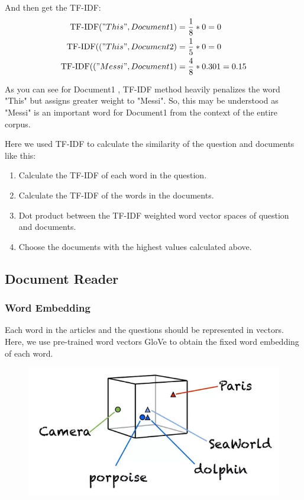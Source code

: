 \documentclass[12pt]{article}
\numberwithin{equation}{section}
\begin{document}
	And then get the TF-IDF:
	\begin{align*}
		\text{TF-IDF}("This",Document1) &= \frac{1}{8} * 0 = 0\\
		\text{TF-IDF}(("This",Document2) &= \frac{1}{5} *0 = 0\\
		\text{TF-IDF}(("Messi",Document1) &= \frac{4}{8} * 0.301 = 0.15
	\end{align*} \par	
	As you can see for Document1 , TF-IDF method heavily penalizes the word "This" but assigns greater weight to "Messi". So, this may be understood as "Messi" is an important word for Document1 from the context of the entire corpus. \par
	Here we used TF-IDF to calculate the similarity of the question and documents like this:
	\begin{enumerate}
	\item Calculate the TF-IDF of each word in the question.
	\item Calculate the TF-IDF of the words in the documents.
	\item Dot product between the TF-IDF weighted word vector spaces of question and documents.
	\item Choose the documents with the highest values calculated above.
	\end{enumerate}
\subsection{Document Reader}
\subsubsection{Word Embedding}
	Each word in the articles and the questions should be represented in vectors. Here, we use pre-trained word vectors GloVe\citep{pennington2014glove} to obtain the fixed word embedding of each word. 
	\begin{figure}[H]
		\includegraphics[width=\linewidth]{fig_QA/wordembedding.png}
		\label{fig:wordembedding}
	\end{figure} \par
\end{document}
